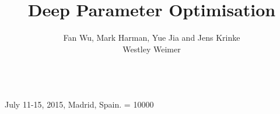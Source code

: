 \documentclass{sig-alternate}
\begin{document}
  {July 11-15, 2015, Madrid, Spain.}
    \widowpenalty = 10000

\title{Deep Parameter Optimisation}

%
\author{
%
%
\alignauthor Fan Wu, Mark Harman, Yue Jia and Jens Krinke\\
\alignauthor Westley Weimer\\
       \\
}
\end{document}
